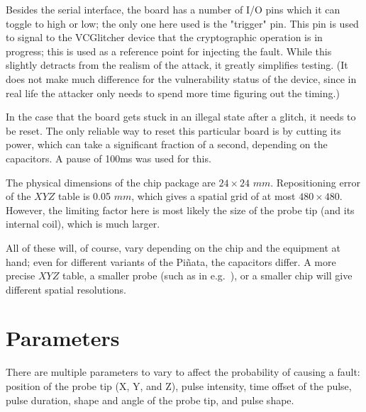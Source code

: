 \documentclass[times, utf8, diplomski]{fer}
\begin{document}
Besides the serial interface, the board has a number of I/O pins which it can
toggle to high or low; the only one here used is the "trigger" pin. This pin is
used to signal to the VCGlitcher device that the cryptographic operation is in
progress; this is used as a reference point for injecting the fault. While this
slightly detracts from the realism of the attack, it greatly simplifies testing.
(It does not make much difference for the vulnerability status of the device,
since in real life the attacker only needs to spend more time figuring out the
timing.)

In the case that the board gets stuck in an illegal state after a glitch, it
needs to be reset. The only reliable way to reset this particular board is by
cutting its power, which can take a significant fraction of a second, depending
on the capacitors. A pause of 100ms was used for this.

The physical dimensions of the chip package are $24 \times 24$ $mm$.
Repositioning error of the $XYZ$ table is 0.05 $mm$, which gives a spatial grid
of at most $480 \times 480$. However, the limiting factor here is most likely
the size of the probe tip (and its internal coil), which is much larger.

All of these will, of course, vary depending on the chip and the equipment at
hand; even for different variants of the Piñata, the capacitors differ.
A more precise $XYZ$ table, a smaller probe (such as in e.g.~\cite{precise_probe_tips}),
or a smaller chip will give different spatial resolutions.


\section{Parameters}\label{sec:parameters}
There are multiple parameters to vary to affect the probability of causing a
fault: position of the probe tip (X, Y, and Z), pulse intensity, time offset
of the pulse, pulse duration, shape and angle of the probe tip, and pulse shape.
\end{document}
